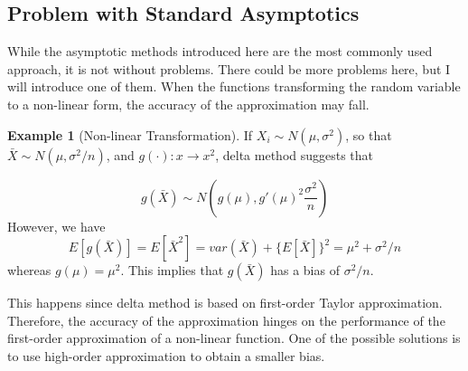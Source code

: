 \documentclass[12pt]{article}
\theoremstyle{definition}
\theoremstyle{property}
\theoremstyle{example}
\newtheorem{example}{Example}[section]
\begin{document}
\subsection{Problem with Standard Asymptotics}
While the asymptotic methods introduced here are the most commonly used approach, it is not without problems. There could be more problems here, but I will introduce one of them. When the functions transforming the random variable to a non-linear form, the accuracy of the approximation may fall.\par
\begin{mdframed}[backgroundcolor=yellow!5] 
\begin{example}[Non-linear Transformation]
If $X_i\sim N(\mu, \sigma^2)$, so that $\bar{X}\sim N(\mu,\sigma^2/n)$, and $g(\cdot):x\to x^2$, delta method suggests that

\[
g(\bar{X})\sim N\left(g(\mu),g'(\mu)^2\frac{\sigma^2}{n}\right)
\]  However, we have
\[
E[g(\bar{X})]=E[\bar{X}^2]=var({\bar{X}})+\{E[\bar{X}]\}^2=\mu^2+\sigma^2/n
\]
whereas $g(\mu)=\mu^2$. This implies that $g(\bar{X})$ has a bias of $\sigma^2/n$.
\end{example}
\end{mdframed}\par
This happens since delta method is based on first-order Taylor approximation. Therefore, the accuracy of the approximation hinges on the performance of the first-order approximation of a non-linear function. One of the possible solutions is to use high-order approximation to obtain a smaller bias.

\end{document}
